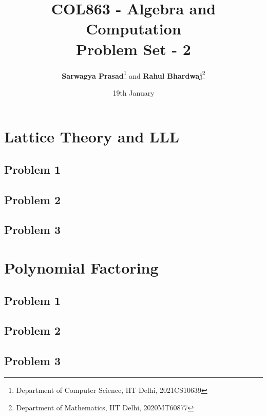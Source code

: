 \documentclass[tikz,
	10pt,
	parskip=half-,		
	paper=a4,			
	english	
	]{scrartcl}
\title{COL863 - Algebra and Computation \\ Problem Set - 2}
\author{\textbf{Sarwagya Prasad}\thanks{Department of Computer Science, IIT Delhi, 2021CS10639} and \textbf{Rahul Bhardwaj}\thanks{Department of Mathematics, IIT Delhi, 2020MT60877}}
\date{19th January}
\begin{document}
\maketitle			
\tableofcontents
\newpage

\section{Lattice Theory and LLL}
\subsection{Problem 1}

\newpage
\subsection{Problem 2}

\newpage
\subsection{Problem 3}

\newpage
\section{Polynomial Factoring}

\subsection{Problem 1}

\newpage
\subsection{Problem 2}

\newpage
\subsection{Problem 3}

\newpage
\end{document}
